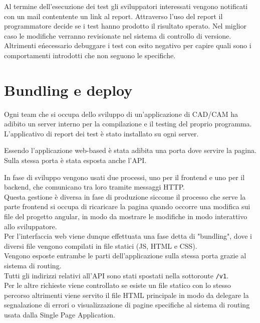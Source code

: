         Al termine dell'esecuzione dei test gli sviluppatori interessati vengono notificati con un mail contentente un link al report.
        Attraverso l'uso del report il programmatore decide se i test hanno prodotto il risultato sperato.
        Nel miglior caso le modifiche verranno revisionate nel sistema di controllo di versione.
        Altrimenti e\' necessario debuggare i test con esito negativo per capire quali sono i comportamenti introdotti che non seguono le specifiche. 

    \section{Bundling e deploy}
        Ogni team che si occupa dello sviluppo di un'applicazione di CAD/CAM ha adibito un server interno per la compilazione e il testing del proprio programma.\\
        L'applicativo di report dei test è stato installato su ogni server.

        Essendo l'applicazione web-based è stata adibita una porta dove servire la pagina.\\
        Sulla stessa porta è stata esposta anche l'API.
        
        In fase di sviluppo vengono usati due processi, uno per il frontend e uno per il backend, che comunicano tra loro tramite messaggi HTTP.\\
        Questa gestione è diversa in fase di produzione siccome il processo che serve la parte frontend si occupa di ricaricare la pagina quando occorre una modifica sui file del progetto angular, in modo da mostrare le modifiche in modo interattivo allo sviluppatore.\\
        Per l'interfaccia web viene dunque effettuata una fase detta di "bundling", dove i diversi file  vengono compilati in file statici (JS, HTML e CSS).\\
        Vengono esposte entrambe le parti dell'applicazione sulla stessa porta grazie al sistema di routing.\\
        Tutti gli indirizzi relativi all'API sono stati spostati nella sottoroute \verb|/v1|.\\
        Per le altre richieste viene controllato se esiste un file statico con lo stesso percorso altrimenti viene servito il file HTML principale in modo da delegare la segnalazione di errori o visualizzazione di pagine specifiche al sistema di routing usata dalla Single Page Application.\\

